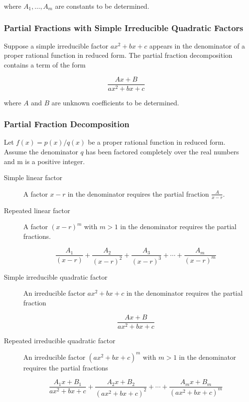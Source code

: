 where $A_1, \ldots, A_m$ are constants to be determined.

\subsubsection{Partial Fractions with Simple Irreducible Quadratic Factors}
Suppose a simple irreducible factor $ax^2 + bx + c$ appears in the denominator of a proper rational function in reduced form. The partial fraction decomposition contains a term of the form

\begin{equation}
    \frac{Ax + B}{ax^2 + bx + c}
\end{equation}

where $A$ and $B$ are unknown coefficients to be determined.


\subsubsection{Partial Fraction Decomposition}
Let $f(x) = p(x) / q(x)$ be a proper rational function in reduced form. Assume the denominator $q$ has been factored completely over the real numbers and m is a positive integer.

\begin{description}
\item [Simple linear factor] A factor $x - r$ in the denominator requires the partial fraction $\frac{A}{x - r}$.
\item [Repeated linear factor] A factor $(x - r)^m$ with $m > 1$ in the denominator requires the partial fractions.

\begin{equation}
    \frac{A_1}{(x - r)} + \frac{A_2}{(x - r)^2} + \frac{A_3}{(x - r)^3} + \cdots + \frac{A_m}{(x - r)^m}
\end{equation}

\item [Simple irreducible quadratic factor] An irreducible factor $ax^2 + bx + c$ in the denominator requires the partial fraction

\begin{equation}
    \frac{Ax + B}{ax^2 +bx + c}
\end{equation}

\item [Repeated irreducible quadratic factor] An irreducible factor $(ax^2 + bx + c)^m$ with $m > 1$ in the denominator requires the partial fractions

\begin{equation}
    \frac{A_1 x + B_1}{ax^2 + bx + c} + \frac{A_2 x + B_2}{(ax^2 + bx + c)^2} + \cdots + \frac{A_m x + B_m}{(ax^2 + bx + c)^m}
\end{equation}
\end{description}
